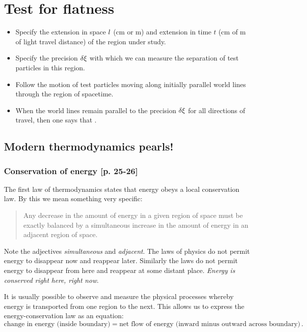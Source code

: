 \section{Test for flatness}
%
\begin{itemize}
  \item Specify the extension in space $l$ (\si{cm} or \si{m}) and extension in time $t$ (\si{cm} of \si{m} of light travel distance) of the region under study.
  \item Specify the precision $\delta\xi$ with which we can measure the separation of test particles in this region.
  \item Follow the motion of test particles moving along initially parallel world lines through the region of spacetime.
  \item When the world lines remain parallel to the precision $\delta\xi$ for all directions of travel, then one says that .
\end{itemize}



\subsection{Modern thermodynamics pearls!}
%
\subsubsection{Conservation of energy [p. 25-26]}
%
The first law of thermodynamics states that energy obeys a local conservation law. By this we mean something very specific:
%
\begin{quotation}
  Any decrease in the amount of energy in a given region of space must be exactly balanced by a simultaneous increase in the amount of energy in an adjacent region of space.
\end{quotation}
%
Note the adjectives \emph{simultaneous} and \emph{adjacent}. The laws of physics do not permit energy to disappear now and reappear later. Similarly the laws do not permit energy to disappear from here and reappear at some distant place. \emph{Energy is conserved right here, right now}.

It is usually possible to observe and measure the physical processes whereby energy is transported from one region to the next. This allows us to express the energy-conservation law as an equation:
%
\begin{equation*}
  \text{change in energy (inside boundary)} = \text{net flow of energy (inward minus outward across boundary)}\,.
\end{equation*}

